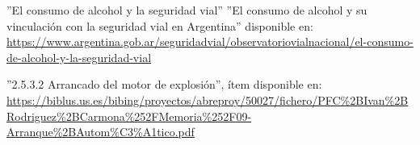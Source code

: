 \documentclass[a4paper,11pt]{article}
\begin{document}
\begin{multicols}{2}
\begin{thebibliography}{6}
			''El consumo de alcohol y la seguridad vial'' ''El consumo de alcohol y su vinculación con la seguridad vial en Argentina'' disponible en: \url{https://www.argentina.gob.ar/seguridadvial/observatoriovialnacional/el-consumo-de-alcohol-y-la-seguridad-vial}
			
			\begin{minipage}{\linewidth}
				\item[\textbf{[6]}]
				''2.5.3.2 Arrancado del motor de explosión'', ítem disponible en: \url{https://biblus.us.es/bibing/proyectos/abreproy/50027/fichero/PFC%2BIvan%2BRodriguez%2BCarmona%252FMemoria%252F09-Arranque%2BAutom%C3%A1tico.pdf}
			\end{minipage}		
			
		\end{thebibliography}
		
	\end{multicols}
	
\end{document}
